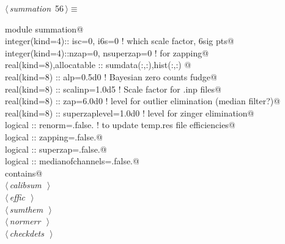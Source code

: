 \documentclass[10pt,a4paper,notitlepage]{article}
\begin{document}
\begin{flushleft} \small
\begin{minipage}{\linewidth}\label{scrap60}\raggedright\small
{} $\langle\,${\it summation}\nobreak\ {\footnotesize {56}}$\,\rangle\equiv$
\vspace{-1ex}
\begin{list}{}{} \item
\mbox{}\verb@      module summation@\\
\mbox{}\verb@      integer(kind=4):: isc=0, i6s=0 !  which scale factor, 6sig pts@\\
\mbox{}\verb@      integer(kind=4)::nzap=0, nsuperzap=0 ! for zapping@\\
\mbox{}\verb@      real(kind=8),allocatable :: sumdata(:,:),hist(:,:)           @\\
\mbox{}\verb@      real(kind=8) :: alp=0.5d0  ! Bayesian zero counts fudge@\\
\mbox{}\verb@      real(kind=8) :: scalinp=1.0d5  ! Scale factor for .inp files@\\
\mbox{}\verb@      real(kind=8) :: zap=6.0d0 ! level for outlier elimination (median filter?)@\\
\mbox{}\verb@      real(kind=8) :: superzaplevel=1.0d0 ! level for zinger elimination@\\
\mbox{}\verb@      logical :: renorm=.false.  ! to update temp.res file efficiencies@\\
\mbox{}\verb@      logical :: zapping=.false.@\\
\mbox{}\verb@      logical :: superzap=.false.@\\
\mbox{}\verb@      logical ::  medianofchannels=.false.@\\
\mbox{}\verb@      contains@\\
\mbox{}\verb@@\hbox{$\langle\,${\it calibsum}\nobreak\ {\footnotesize {}}$\,\rangle$}\verb@@\\
\mbox{}\verb@@\hbox{$\langle\,${\it effic}\nobreak\ {\footnotesize {}}$\,\rangle$}\verb@@\\
\mbox{}\verb@@\hbox{$\langle\,${\it sumthem}\nobreak\ {\footnotesize {}}$\,\rangle$}\verb@@\\
\mbox{}\verb@@\hbox{$\langle\,${\it normerr}\nobreak\ {\footnotesize {}}$\,\rangle$}\verb@@\\
\mbox{}\verb@@\hbox{$\langle\,${\it checkdets}\nobreak\ {\footnotesize {}}$\,\rangle$}\verb@@\\

\end{list}
\end{minipage}
\end{flushleft}
\end{document}
